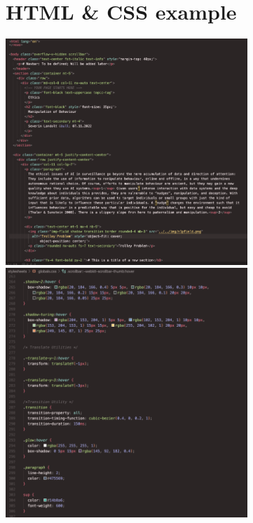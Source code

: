 \documentclass[12pt]{article}
\begin{document}
\section{HTML \& CSS example}
\begin{center}
\includegraphics[width=345px]{Templstepage_html.png}\\
\vspace{1em}
\includegraphics[width=345px]{CSScode.png}
\end{center}
\end{document}
